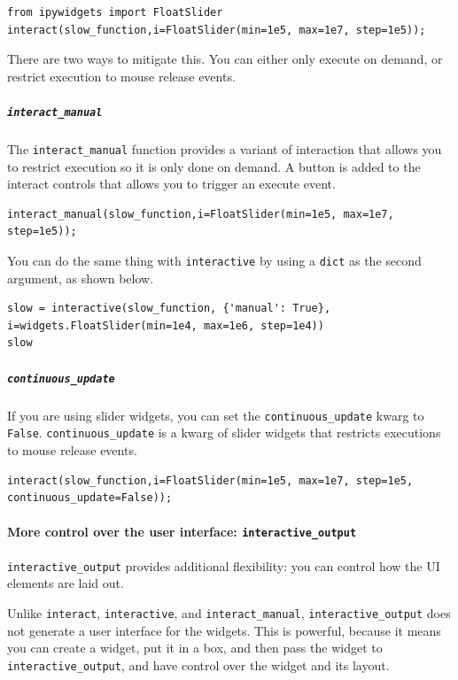 \begin{verbatim}
from ipywidgets import FloatSlider
interact(slow_function,i=FloatSlider(min=1e5, max=1e7, step=1e5));
\end{verbatim}

There are two ways to mitigate this.  You can either only execute on demand, or restrict execution to mouse release events.

\subparagraph{\texttt{interact\_manual}}

The \texttt{interact\_manual} function provides a variant of interaction that allows you to restrict execution so it is only done on demand.  A button is added to the interact controls that allows you to trigger an execute event.

\begin{verbatim}
interact_manual(slow_function,i=FloatSlider(min=1e5, max=1e7, step=1e5));
\end{verbatim}

You can do the same thing with \texttt{interactive} by using a \texttt{dict} as the second argument, as shown below.

\begin{verbatim}
slow = interactive(slow_function, {'manual': True}, i=widgets.FloatSlider(min=1e4, max=1e6, step=1e4))
slow
\end{verbatim}

\subparagraph{\texttt{continuous\_update}}

If you are using slider widgets, you can set the \texttt{continuous\_update} kwarg to \texttt{False}.  \texttt{continuous\_update} is a kwarg of slider widgets that restricts executions to mouse release events.

\begin{verbatim}
interact(slow_function,i=FloatSlider(min=1e5, max=1e7, step=1e5, continuous_update=False));
\end{verbatim}

\paragraph{More control over the user interface: \texttt{interactive\_output}}

\texttt{interactive\_output} provides additional flexibility: you can control how the UI elements are laid out.

Unlike \texttt{interact}, \texttt{interactive}, and \texttt{interact\_manual}, \texttt{interactive\_output} does not generate a user interface for the widgets. This is powerful, because it means you can create a widget, put it in a box, and then pass the widget to \texttt{interactive\_output}, and have control over the widget and its layout.

